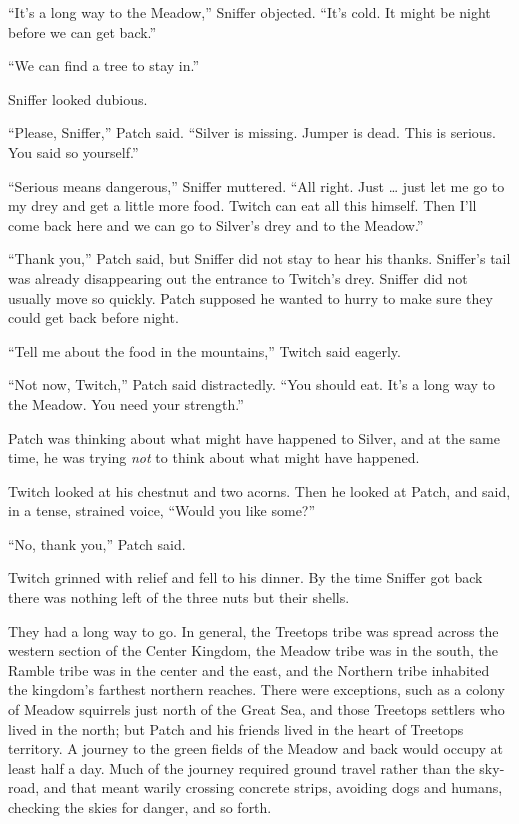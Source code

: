 \documentclass[ebook,oneside,openany,17pt]{memoir}
\newenvironment{tolerant}[1]{%
  \par\tolerance=#1\relax
}{%
  \par
}
\begin{document}
“It’s a long way to the Meadow,” Sniffer objected. “It’s cold. It
might be night before we can get back.”

“We can find a tree to stay in.”

Sniffer looked dubious.

“Please, Sniffer,” Patch said. “Silver is missing. Jumper is
dead. This is serious. You said so yourself.”

\begin{tolerant}{1000}
“Serious means dangerous,” Sniffer muttered. “All right. Just … just
let me go to my drey and get a little more food. Twitch can eat all
this himself. Then I’ll come back here and we can go to Silver’s drey
and to the Meadow.”
\end{tolerant}

“Thank you,” Patch said, but Sniffer did not stay to hear his
thanks. Sniffer’s tail was already disappearing out the entrance to
Twitch’s drey. Sniffer did not usually move so quickly. Patch supposed
he wanted to hurry to make sure they could get back before night.

“Tell me about the food in the mountains,” Twitch said eagerly.

“Not now, Twitch,” Patch said distractedly. “You should eat. It’s a
long way to the Meadow. You need your strength.”

Patch was thinking about what might have happened to Silver, and at
the same time, he was trying \emph{not} to think about what might
have happened.

Twitch looked at his chestnut and two acorns. Then he looked at Patch,
and said, in a tense, strained voice, “Would you like some?”

“No, thank you,” Patch said.

Twitch grinned with relief and fell to his dinner. By the time Sniffer
got back there was nothing left of the three nuts but their shells.

\begin{tolerant}{1000}
They had a long way to go. In general, the Treetops tribe was spread
across the western section of the Center Kingdom, the Meadow tribe was
in the south, the Ramble tribe was in the center and the east, and the
Northern tribe inhabited the kingdom’s farthest northern
reaches. There were exceptions, such as a colony of Meadow squirrels
just north of the Great Sea, and those Treetops settlers who lived in
the north; but Patch and his friends lived in the heart of Treetops
territory. A journey to the green fields of the Meadow and back would
occupy at least half a day. Much of the journey required ground travel
rather than the sky-road, and that meant warily crossing concrete
strips, avoiding dogs and humans, checking the skies for danger, and
so forth.
\end{tolerant}
\end{document}
